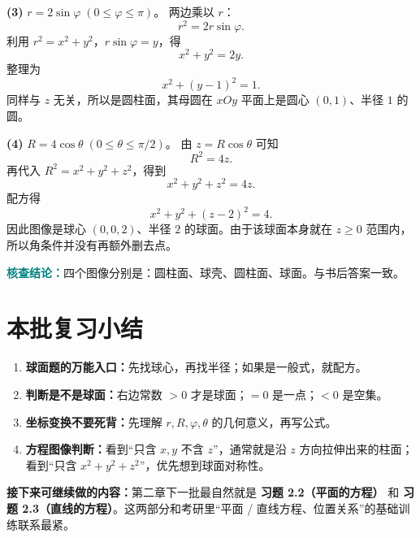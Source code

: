 \documentclass[UTF8,a4paper,11pt,fontset=none]{ctexart}
\newcommand{\ans}[1]{\par\noindent\textcolor{teal}{\sffamily\bfseries 核查结论：}#1\par}
\newcommand{\tip}[1]{\begin{tcolorbox}[colback=light,colframe=rulegray,boxrule=0.4pt,arc=1.5mm,left=3mm,right=3mm,top=2mm,bottom=2mm]#1\end{tcolorbox}}
\begin{document}
\textbf{(3) }$r=2\sin\varphi\;(0\le \varphi\le \pi)$。
两边乘以 $r$：
\[
 r^2=2r\sin\varphi.
\]
利用 $r^2=x^2+y^2$，$r\sin\varphi=y$，得
\[
 x^2+y^2=2y.
\]
整理为
\[
 x^2+(y-1)^2=1.
\]
同样与 $z$ 无关，所以是圆柱面，其母圆在 $xOy$ 平面上是圆心 $(0,1)$、半径 $1$ 的圆。

\textbf{(4) }$R=4\cos\theta\;(0\le \theta\le \pi/2)$。
由 $z=R\cos\theta$ 可知
\[
 R^2=4z.
\]
再代入 $R^2=x^2+y^2+z^2$，得到
\[
 x^2+y^2+z^2=4z.
\]
配方得
\[
 x^2+y^2+(z-2)^2=4.
\]
因此图像是球心 $(0,0,2)$、半径 $2$ 的球面。由于该球面本身就在 $z\ge 0$ 范围内，所以角条件并没有再额外删去点。
\ans{四个图像分别是：圆柱面、球壳、圆柱面、球面。与书后答案一致。}

\clearpage
\section*{本批复习小结}
\begin{enumerate}
\item \textbf{球面题的万能入口：}先找球心，再找半径；如果是一般式，就配方。
\item \textbf{判断是不是球面：}右边常数 $>0$ 才是球面；$=0$ 是一点；$<0$ 是空集。
\item \textbf{坐标变换不要死背：}先理解 $r,R,\varphi,\theta$ 的几何意义，再写公式。
\item \textbf{方程图像判断：}看到“只含 $x,y$ 不含 $z$”，通常就是沿 $z$ 方向拉伸出来的柱面；看到“只含 $x^2+y^2+z^2$”，优先想到球面对称性。
\end{enumerate}
\tip{\textbf{接下来可继续做的内容：}第二章下一批最自然就是 \textbf{习题 2.2（平面的方程）} 和 \textbf{习题 2.3（直线的方程）}。这两部分和考研里“平面 / 直线方程、位置关系”的基础训练联系最紧。}
\end{document}
